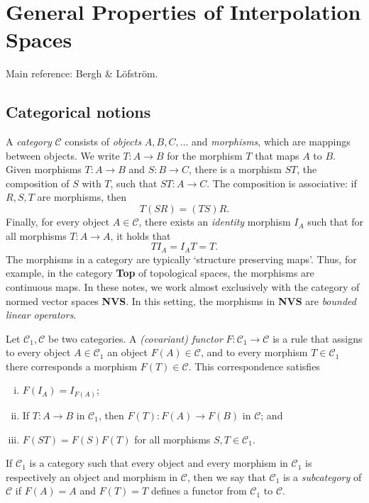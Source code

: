 \section{General Properties of Interpolation Spaces}
Main reference: Bergh \& L\"{o}fstr\"{o}m.

\subsection{Categorical notions}
A \emph{category} $\mathscr{C}$ consists of \emph{objects} $A,B,C,\ldots$ and \emph{morphisms}, which are mappings between objects. We write $T:A\to B$ for the morphism $T$ that maps $A$ to $B$. Given morphisms $T:A\to B$ and $S:B\to C$, there is a morphism $ST$, the composition of $S$ with $T$, such that $ST:A\to C$. The composition is associative: if $R,S,T$ are morphisms, then
\begin{equation*}
    T(SR) = (TS)R.
\end{equation*}
Finally, for every object $A\in\mathscr{C}$, there exists an \emph{identity} morphism $I_A$ such that for all morphisms $T:A\to A$, it holds that
\begin{equation*}
    TI_A = I_AT = T.
\end{equation*}
The morphisms in a category are typically `structure preserving maps'. Thus, for example, in the category \textbf{Top} of topological spaces, the morphisms are continuous maps. In these notes, we work almost exclusively with the category of normed vector spaces \textbf{NVS}. In this setting, the morphisms in \textbf{NVS} are \emph{bounded linear operators}.

Let $\mathscr{C}_1, \mathscr{C}$ be two categories. A \emph{(covariant) functor} $F:\mathscr{C}_1 \to \mathscr{C}$ is a rule that assigns to every object $A\in\mathscr{C}_1$ an object $F(A)\in\mathscr{C}$, and to every morphism $T\in\mathscr{C}_1$ there corresponds a morphism $F(T)\in \mathscr{C}$. This correspondence satisfies
\begin{enumerate}[(i)]
    \item $F(I_A) = I_{F(A)}$;
    \item If $T:A\to B$ in $\mathscr{C}_1$, then $F(T):F(A)\to F(B)$ in $\mathscr{C}$; and 
    \item $F(ST)=F(S)F(T)$ for all morphisms $S,T\in\mathscr{C}_1$.
\end{enumerate}

If $\mathscr{C}_1$ is a category such that every object and every morphism in $\mathscr{C}_1$ is respectively an object and morphism in $\mathscr{C}$, then we say that $\mathscr{C}_1$ is a \emph{subcategory} of $\mathscr{C}$ if $F(A)=A$ and $F(T)=T$ defines a functor from $\mathscr{C}_1$ to $\mathscr{C}$.


